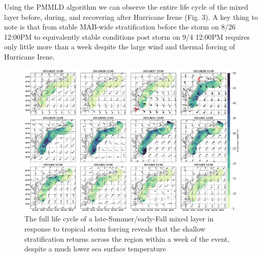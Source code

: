 \documentclass{article}
\begin{document}
Using the PMMLD algorithm we can observe the entire life cycle of the mixed layer before, during, and recovering after Hurricane Irene (Fig. 3). 
A key thing to note is that from stable MAB-wide stratification before the storm on 8/26 12:00PM to equivalently stable conditions post storm on 9/4 12:00PM requires only little more than a week despite the large wind and thermal forcing of Hurricane Irene.
\begin{figure}[h]
\caption{The full life cycle of a late-Summer/early-Fall mixed layer in response to tropical storm forcing reveals that the shallow stratification returns across the region within a week of the event, despite a much lower sea surface temperature}
\centering
\includegraphics[width=1.0\textwidth, keepaspectratio]{irene_barbs_4koma.eps}
\end{figure}
\end{document}
